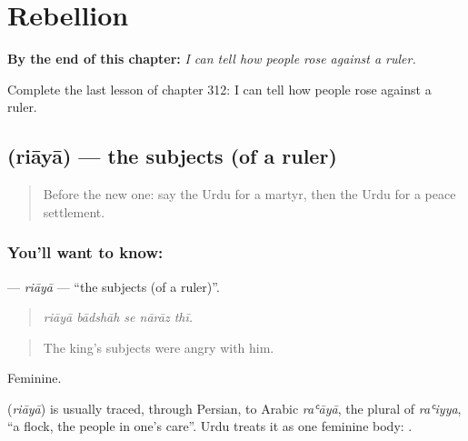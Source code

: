 
\chapter{Rebellion}
\label{ch:ur-rebellion}

\begin{chapteropening}
\textbf{By the end of this chapter:} \emph{I can tell how people rose against a ruler.}

Complete the last lesson of chapter 312: I can tell how people rose against a ruler.
\end{chapteropening}

\section[\texorpdfstring{\ur{رعایا} (riāyā)}{رعایا (riāyā)}]{ (riāyā) — the subjects (of a ruler)}

\label{lesson:UR-C312-riaya}



\begin{quote}
Before the new one: say the Urdu for a martyr, then the Urdu for a peace settlement.
\end{quote}

\subsection*{You'll want to know: }
\textbf{} — \emph{riāyā} — \textquotedblleft{}the subjects (of a ruler)\textquotedblright{}.

\begin{quote}
    
\end{quote}

\begin{quote}
\emph{riāyā bādshāh se nārāz thī.}
\end{quote}

\begin{quote}
The king's subjects were angry with him.
\end{quote}

Feminine.

\begin{cousinweb}
\textbf{} (\emph{riāyā}) is usually traced, through Persian, to Arabic \emph{raʿāyā}, the plural of \emph{raʿiyya}, \textquotedblleft{}a flock, the people in one's care\textquotedblright{}. Urdu treats it as one feminine body: \textbf{  }.
\end{cousinweb}

